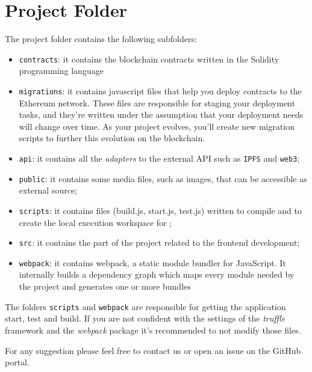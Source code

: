 \section{Project Folder}
The project folder contains the following subfolders:
\begin{itemize}
	\item\verb|contracts|: it contains the blockchain contracts written in the Solidity programming language
    \item\verb|migrations|: it contains javascript files that help you deploy contracts to the Ethereum network. These files are
    responsible for staging your deployment tasks, and they're written under the assumption that your deployment needs will change over time.
    As your project evolves, you'll create new migration scripts to further this evolution on the blockchain.
    \item\verb|api|: it  contains all the \emph{adapters} to the external API such as \verb|IPFS| and \verb|web3|;
    \item\verb|public|: it contains some media files, such as images, that can be accessible as external source;
    \item\verb|scripts|: it contains files (build.js, start.js, test.js) written to compile and to create the local execution workspace for
    	\project;
    \item\verb|src|: it contains the part of the project related to the frontend development;
    \item\verb|webpack|: it contains webpack, a static module bundler for JavaScript. It internally builds a dependency graph 
    which maps every module needed by the project and generates one or more bundles
\end{itemize}
The folders \verb|scripts| and \verb|webpack| are responsible for getting the application start, test and build. If you are not confident with the settings of the \emph{truffle} framework and the \emph{webpack} package it's recommended to not modify those files.

For any suggestion please feel free to contact us or open an issue on the GitHub portal.